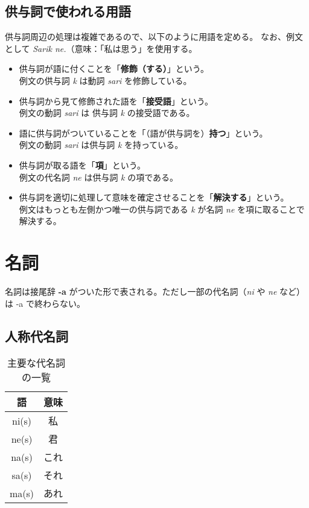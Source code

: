 \subsection{供与詞で使われる用語}

供与詞周辺の処理は複雑であるので、以下のように用語を定める。
なお、例文として \emph{Sarik ne.}（意味：「私は思う」を使用する。

\begin{itemize}
    \item 供与詞が語に付くことを「\textbf{修飾（する）}」という。 \\ 例文の供与詞 \emph{k} は動詞 \emph{sari} を修飾している。
    \item 供与詞から見て修飾された語を「\textbf{接受語}」という。\\ 例文の動詞 \emph{sari} は 供与詞 \emph{k} の接受語である。
    \item 語に供与詞がついていることを「（語が供与詞を）\textbf{持つ}」という。 \\ 例文の動詞 \emph{sari} は供与詞 \emph{k} を持っている。
    \item 供与詞が取る語を「\textbf{項}」という。 \\ 例文の代名詞 \emph{ne} は供与詞 \emph{k} の項である。
    \item 供与詞を適切に処理して意味を確定させることを「\textbf{解決する}」という。 \\例文はもっとも左側かつ唯一の供与詞である \emph{k} が名詞 \emph{ne} を項に取ることで解決する。
\end{itemize}

\section{名詞}

名詞は接尾辞 \textbf{-a} がついた形で表される。ただし一部の代名詞（\emph{ni} や \emph{ne} など）は -a で終わらない。

\subsection{人称代名詞}

\begin{wraptable}[8]{r}{50mm}
    \centering
    \caption{主要な代名詞の一覧}
    \label{table:list-of-pron}
    \begin{tabular}{cc}
        \toprule
        語 & 意味 \\
        \midrule
        ni(s) & 私 \\
        ne(s) & 君 \\
        na(s) & これ \\
        sa(s) & それ \\
        ma(s) & あれ \\
        \bottomrule
    \end{tabular}
\end{wraptable}

